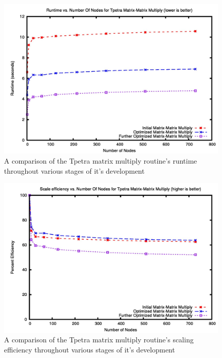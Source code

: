 \documentclass{article}
\begin{document}
\begin{figure}
\includegraphics[scale=.4]{tpetratime.jpg}
\caption[Time Comparison]{A comparison of the Tpetra matrix multiply routine's runtime 
throughout various stages of it's development}
\label{tpetracomptime}
\end{figure}

\begin{figure}
\includegraphics[scale=.4]{tpetraeff.jpg}
\caption[Efficiency Comparison]{A comparison of the Tpetra matrix multiply routine's scaling efficiency
throughout various stages of it's development}
\label{tpetracompeff}
\end{figure}
\end{document}
